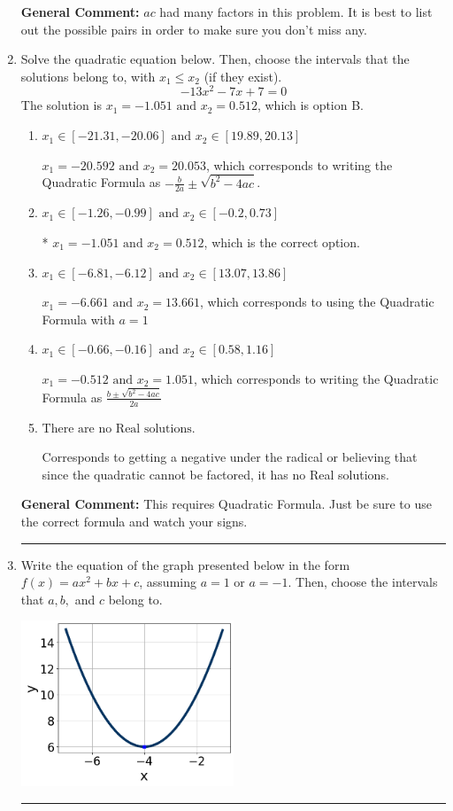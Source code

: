 \documentclass{extbook}[14pt]
\newcommand{\litem}[1]{\item #1

\rule{\textwidth}{0.4pt}}
\begin{document}
\begin{enumerate}
{\textbf{General Comment:} $ac$ had many factors in this problem. It is best to list out the possible pairs in order to make sure you don't miss any.
}
\litem{
Solve the quadratic equation below. Then, choose the intervals that the solutions belong to, with $x_1 \leq x_2$ (if they exist).
\[ -13x^{2} -7 x + 7 = 0 \]The solution is \( x_1 = -1.051 \text{ and } x_2 = 0.512 \), which is option B.\begin{enumerate}[label=\Alph*.]
\item \( x_1 \in [-21.31, -20.06] \text{ and } x_2 \in [19.89, 20.13] \)

 $x_1 = -20.592 \text{ and } x_2 = 20.053$, which corresponds to writing the Quadratic Formula as $-\frac{b}{2a} \pm \sqrt{b^2 - 4ac}$.
\item \( x_1 \in [-1.26, -0.99] \text{ and } x_2 \in [-0.2, 0.73] \)

* $x_1 = -1.051 \text{ and } x_2 = 0.512$, which is the correct option.
\item \( x_1 \in [-6.81, -6.12] \text{ and } x_2 \in [13.07, 13.86] \)

 $x_1 = -6.661 \text{ and } x_2 = 13.661$, which corresponds to using the Quadratic Formula with $a=1$
\item \( x_1 \in [-0.66, -0.16] \text{ and } x_2 \in [0.58, 1.16] \)

 $x_1 = -0.512 \text{ and } x_2 = 1.051$, which corresponds to writing the Quadratic Formula as $\frac{b \pm \sqrt{b^2 - 4ac}}{2a}$
\item \( \text{There are no Real solutions.} \)

Corresponds to getting a negative under the radical or believing that since the quadratic cannot be factored, it has no Real solutions.
\end{enumerate}

\textbf{General Comment:} This requires Quadratic Formula. Just be sure to use the correct formula and watch your signs.
}
\litem{
Write the equation of the graph presented below in the form $f(x)=ax^2+bx+c$, assuming  $a=1$ or $a=-1$. Then, choose the intervals that $a, b,$ and $c$ belong to.

\begin{center}
    \includegraphics[width=0.5\textwidth]{../Figures/quadraticGraphToEquationA.png}
\end{center}


}
\end{enumerate}
\end{document}
